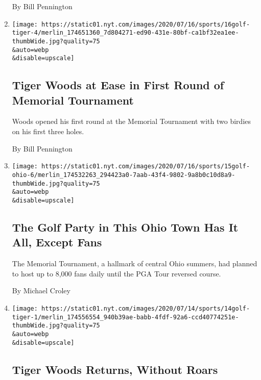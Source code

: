 \begin{enumerate}
  By Bill Pennington
\item
  \href{/2020/07/16/sports/golf/tiger-woods-memorial-tournament-pga.html}{}

  \texttt{[image: https://static01.nyt.com/images/2020/07/16/sports/16golf-tiger-4/merlin\_174651360\_7d804271-ed90-431e-80bf-ca1bf32ea1ee-thumbWide.jpg?quality=75\\\&auto=webp\\\&disable=upscale]}

  \hypertarget{tiger-woods-at-ease-in-first-round-of-memorial-tournament}{%
  \subsection{Tiger Woods at Ease in First Round of Memorial
  Tournament}\label{tiger-woods-at-ease-in-first-round-of-memorial-tournament}}

  Woods opened his first round at the Memorial Tournament with two
  birdies on his first three holes.

  By Bill Pennington
\item
  \href{/2020/07/15/sports/golf/memorial-tournament-ohio-fans.html}{}

  \texttt{[image: https://static01.nyt.com/images/2020/07/16/sports/15golf-ohio-6/merlin\_174532263\_294423a0-7aab-43f4-9802-9a8b0c10d8a9-thumbWide.jpg?quality=75\\\&auto=webp\\\&disable=upscale]}

  \hypertarget{the-golf-party-in-this-ohio-town-has-it-all-except-fans}{%
  \subsection{The Golf Party in This Ohio Town Has It All, Except
  Fans}\label{the-golf-party-in-this-ohio-town-has-it-all-except-fans}}

  The Memorial Tournament, a hallmark of central Ohio summers, had
  planned to host up to 8,000 fans daily until the PGA Tour reversed
  course.

  By Michael Croley
\item
  \href{/2020/07/14/sports/golf/tiger-woods-memorial-tournament.html}{}

  \texttt{[image: https://static01.nyt.com/images/2020/07/14/sports/14golf-tiger-1/merlin\_174556554\_940b39ae-babb-4fdf-92a6-ccd40774251e-thumbWide.jpg?quality=75\\\&auto=webp\\\&disable=upscale]}

  \hypertarget{tiger-woods-returns-without-roars}{%
  \subsection{Tiger Woods Returns, Without
  Roars}\label{tiger-woods-returns-without-roars}}


\end{enumerate}
